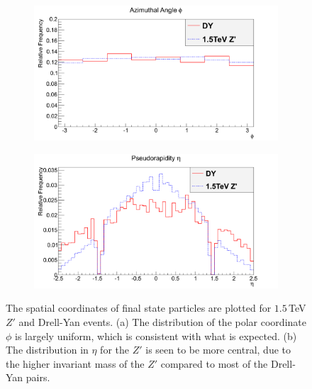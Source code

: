 \documentclass{article}
\begin{document}
\begin{figure}[h]
    \centering
    \begin{subfigure}{.49\textwidth}
        \includegraphics[height=0.6\textwidth]{images/variables/Phi.png}
        \caption{}
        \label{fig:phi}
    \end{subfigure}
    \begin{subfigure}{.49\textwidth}
        \includegraphics[height=0.6\textwidth]{images/variables/Eta.png}
        \caption{}
        \label{fig:eta}
    \end{subfigure}
    \caption{The spatial coordinates of final state particles are plotted for $1.5\,$TeV $Z'$ and Drell-Yan events. (a) The distribution of the polar coordinate $\phi$ is largely uniform, which is consistent with what is expected. (b) The distribution in $\eta$ for the $Z'$ is seen to be more central, due to the higher invariant mass of the $Z'$ compared to most of the Drell-Yan pairs.\label{fig:etaPhi}}
\end{figure}
\end{document}
